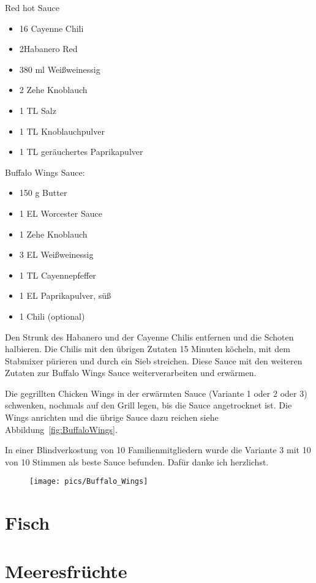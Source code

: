 Red hot Sauce

\begin{itemize}[noitemsep]
	\item 16 Cayenne Chili
	\item 2Habanero Red
	\item 380 ml Weißweinessig
	\item 2 Zehe Knoblauch
	\item 1 TL Salz
	\item 1 TL Knoblauchpulver
	\item 1 TL geräuchertes Paprikapulver
\end{itemize}

Buffalo Wings Sauce:

\begin{itemize}[noitemsep]
	\item 150 g Butter
	\item 1 EL Worcester Sauce
	\item 1 Zehe Knoblauch 
	\item 3 EL Weißweinessig
	\item 1 TL Cayennepfeffer
	\item 1 EL Paprikapulver, süß
	\item 1 Chili (optional)
\end{itemize}

Den Strunk des Habanero und der Cayenne Chilis entfernen und die Schoten halbieren. Die Chilis mit den übrigen Zutaten 15 
Minuten 
köcheln, mit dem Stabmixer pürieren und durch ein Sieb streichen. Diese Sauce mit den weiteren Zutaten zur Buffalo Wings 
Sauce 
weiterverarbeiten und erwärmen.

Die gegrillten Chicken Wings in der erwärmten Sauce (Variante 1 oder 2 oder 3) schwenken, nochmals auf den Grill legen, bis 
die Sauce 
angetrocknet ist. Die Wings anrichten und die übrige Sauce dazu reichen siehe Abbildung~\vref{fig:BuffaloWings}.

In einer Blindverkostung von 10 Familienmitgliedern wurde die Variante 3 mit 10 von 10 Stimmen als beste Sauce befunden. 
Dafür danke 
ich herzlichst.                    
\newpage

\begin{figure}[htbp]
	\centering
	\begin{minipage}{1\textwidth}
		\centering
		\texttt{[image: pics/Buffalo\_Wings]}
		\label{fig:BuffaloWings}
	\end{minipage}
\end{figure}

\newpage
\section{Fisch}

\section{Meeresfrüchte}